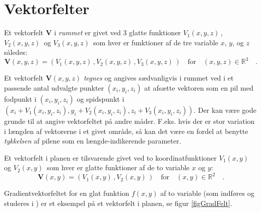 





\section{Vektorfelter} \label{secVektorfelter}

Et {vektorfelt} $\mathbf{V}$ i \emph{rummet} er givet ved $3$ glatte funktioner
$V_{1}(x,y,z)\,$, $V_{2}(x,y,z)\,$ og  $V_{3}(x,y,z)\,$ som hver er funktioner af de tre variable $x$, $y$, og $z$ således:
\begin{equation}
{\mathbf{V}}(x,y,z) = \left(V_{1}(x,y,z)\,, V_{2}(x,y,z)\,,
V_{3}(x,y,z)\,\right) \quad {\text{for}}\quad (x,y,z) \in
\mathbb{R}^{3} \quad .
\end{equation}

\begin{info}
Et vektorfelt $\mathbf{V}(x,y,z)$ \emph{tegnes} og angives sædvanligvis i rummet ved i et passende antal udvalgte punkter $(x_{i}, y_{i}, z_{i})$ at afsætte vektoren som en pil med fodpunkt i  $(x_{i}, y_{i}, z_{i})$ og spidspunkt i $(x_{i}+ V_{1}(x_{i}, y_{i}, z_{i}), y_{i}+V_{2}(x_{i}, y_{i}, z_{i}), z_{i}+ V_{3}(x_{i}, y_{i}, z_{i}))$. Der kan være gode grunde til at angive vektorfeltet på andre måder. F.eks. hvis der er stor variation i længden af vektorerne i et givet område, så kan det være en fordel at benytte \emph{tykkelsen} af pilene som en længde-indikerende parameter.
\end{info}

Et vektorfelt i planen er tilsvarende givet ved to koordinatfunktioner $V_{1}(x,y)\,$ og $V_{2}(x,y)\,$ som hver er glatte funktioner af de to variable $x$ og $y$:
\begin{equation}
{\mathbf{V}}(x,y) = \left(V_{1}(x,y)\,, V_{2}(x,y)\,\right) \quad {\text{for}}\quad (x,y) \in
\mathbb{R}^{2} \quad .
\end{equation}

Gradientvektorfeltet for en glat funktion $f(x,y)$  af to variable (som indføres og studeres i )  er et eksempel på et vektorfelt i planen, se figur \ref{figGradFelt}. \\


